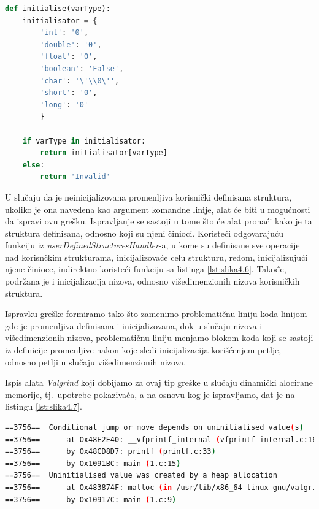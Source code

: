 \documentclass[12pt,oneside]{memoir}
\theoremstyle{plain}
\theoremstyle{definition}
\begin{document}
\begin{lstlisting}[style=mystyle,caption={Funkcija inicijalizacije}, label={lst:slika4.6},language={Python}] 
def initialise(varType):
	initialisator = {
		'int': '0',
		'double': '0',
		'float': '0',
		'boolean': 'False',
		'char': '\'\\0\'',
		'short': '0',
		'long': '0'
	    }
	
	if varType in initialisator:
		return initialisator[varType]
	else:
		return 'Invalid'
\end{lstlisting}


U slučaju da je neinicijalizovana promenljiva korisnički definisana struktura, ukoliko je ona navedena kao argument komandne linije, alat će biti u mogućnosti da ispravi ovu grešku. Ispravljanje se sastoji u tome što će alat pronaći kako je ta struktura definisana, odnosno koji su njeni činioci. Koristeći odgovarajuću funkciju iz \textit{userDefinedStructuresHandler}-a, u kome su definisane sve operacije nad korisnčkim strukturama, inicijalizovaće celu strukturu, redom, inicijalizujući njene činioce, indirektno koristeći funkciju sa listinga \ref{lst:slika4.6}. Takođe, podržana je i inicijalizacija nizova, odnosno višedimenzionih nizova korisničkih struktura. 

Ispravku greške formiramo tako što zamenimo problematičnu liniju koda linijom gde je promenljiva definisana i inicijalizovana, dok u slučaju nizova i višedimenzionih nizova, problematičnu liniju menjamo blokom koda koji se sastoji iz definicije promenljive nakon koje sledi inicijalizacija korišćenjem petlje, odnosno petlji u slučaju višedimenzionih nizova. 

Ispis alata \textit{Valgrind} koji dobijamo za ovaj tip greške u slučaju dinamički alocirane memorije, tj.~upotrebe pokazivača, a na osnovu kog je ispravljamo, dat je na listingu \ref{lst:slika4.7}.


\begin{lstlisting}[style=terminal,caption={Ispis greške korišćenja dinamiči alocirane neinicijalizovane promenljive (pokazivača)}, label={lst:slika4.7},language={bash}]   
==3756==  Conditional jump or move depends on uninitialised value(s)
==3756==      at Ox48E2E40: __vfprintf_internal (vfprintf-internal.c:1644)
==3756==      by Ox48CD8D7: printf (printf.c:33)
==3756==      by Ox1091BC: main (1.c:15)
==3756==  Uninitialised value was created by a heap allocation
==3756==      at Ox483874F: malloc (in /usr/lib/x86_64-linux-gnu/valgrind/vgpreload_memcheck-amd64-linux.so) 
==3756==      by Ox10917C: main (1.c:9)
\end{lstlisting}
\end{document}
